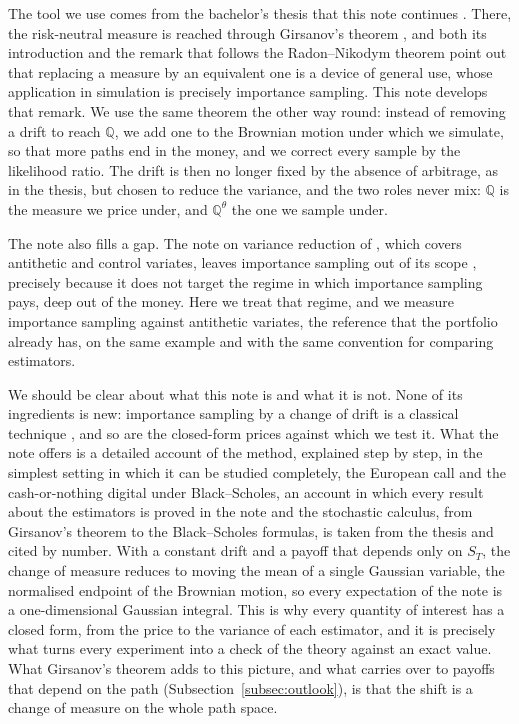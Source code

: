 \documentclass[11pt,a4paper]{article}
\theoremstyle{plain}
\theoremstyle{definition}
\theoremstyle{remark}
\newcommand{\Q}{\mathbb{Q}}
\newcommand{\1}{\mathbf{1}}
\newcommand{\Qt}{\Q^{\theta}}
\begin{document}
The tool we use comes from the bachelor's thesis that this note continues \cite{tfg}. There, the risk-neutral measure is reached through Girsanov's theorem \cite[Thm~4.20]{tfg}, and both its introduction \cite[\S 1.1]{tfg} and the remark that follows the Radon--Nikodym theorem \cite[Remark~4.16]{tfg} point out that replacing a measure by an equivalent one is a device of general use, whose application in simulation is precisely importance sampling. This note develops that remark. We use the same theorem the other way round: instead of removing a drift to reach $\Q$, we add one to the Brownian motion under which we simulate, so that more paths end in the money, and we correct every sample by the likelihood ratio. The drift is then no longer fixed by the absence of arbitrage, as in the thesis, but chosen to reduce the variance, and the two roles never mix: $\Q$ is the measure we price under, and $\Qt$ the one we sample under.

The note also fills a gap. The note on variance reduction of \cite{portfolio}, which covers antithetic and control variates, leaves importance sampling out of its scope \cite[\S 6]{portfolio}, precisely because it does not target the regime in which importance sampling pays, deep out of the money. Here we treat that regime, and we measure importance sampling against antithetic variates, the reference that the portfolio already has, on the same example and with the same convention for comparing estimators.

We should be clear about what this note is and what it is not. None of its ingredients is new: importance sampling by a change of drift is a classical technique \cite[\S 4.6]{glasserman}, and so are the closed-form prices against which we test it. What the note offers is a detailed account of the method, explained step by step, in the simplest setting in which it can be studied completely, the European call and the cash-or-nothing digital under Black--Scholes, an account in which every result about the estimators is proved in the note and the stochastic calculus, from Girsanov's theorem to the Black--Scholes formulas, is taken from the thesis and cited by number. With a constant drift and a payoff that depends only on $S_T$, the change of measure reduces to moving the mean of a single Gaussian variable, the normalised endpoint of the Brownian motion, so every expectation of the note is a one-dimensional Gaussian integral. This is why every quantity of interest has a closed form, from the price to the variance of each estimator, and it is precisely what turns every experiment into a check of the theory against an exact value. What Girsanov's theorem adds to this picture, and what carries over to payoffs that depend on the path (Subsection~\ref{subsec:outlook}), is that the shift is a change of measure on the whole path space.
\end{document}
